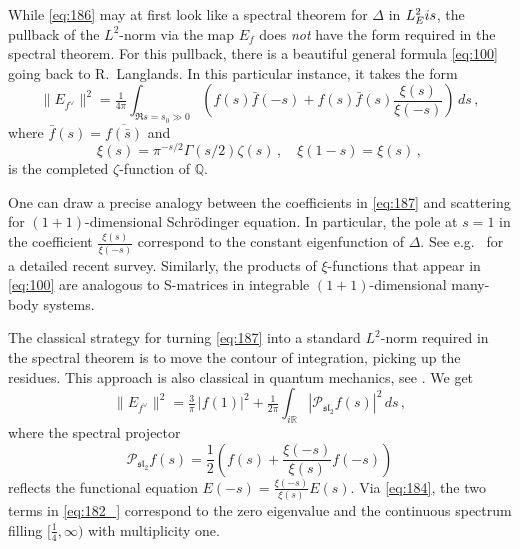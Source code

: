 \documentclass[14pt]{extarticle}
\newcommand{\Q}{\mathbb{Q}}
\newcommand{\R}{\mathbb{R}}
\newcommand{\cP}{\mathscr{P}}
\newcommand{\Eis}{\textup{Eis}}
\theoremstyle{definition}
\begin{document}
While \eqref{eq:186} may at first look like a spectral theorem for
$\Delta$ in $L^2_\Eis$, the pullback of the $L^2$-norm via the map $E_f$
does \emph{not} have the form required in the
spectral theorem. For this pullback, there is a beautiful
general formula \eqref{eq:100} going back to R.~Langlands.
In this particular instance, it 
takes the form  
%
\begin{equation}
\| E_{f^\vee}\|^2 = \tfrac{1}{4\pi} \int_{\Re s = s_0 \gg 0} \left(f(s) \bar f(-s) +
f(s) \bar f(s) \frac{\xi(s)}{\xi(-s)} \right) \, ds \,,  \label{eq:187}
\end{equation}
%
where $\bar f(s) = \overline{f(\bar s)}$ and 
%
\begin{equation}
  \label{eq:188}
  \xi(s) = \pi^{-s/2} \Gamma(s/2) \zeta(s) \,, \quad \xi(1-s) = \xi(s)
  \,,
\end{equation}
%
is the completed $\zeta$-function of $\Q$.



One can draw a precise analogy
between the coefficients in \eqref{eq:187} and scattering for
$(1+1)$-dimensional
Schr\"odinger equation. In particular, the pole at $s=1$ in the
coefficient 
$\frac{\xi(s)}{\xi(-s)}$ correspond to the
constant eigenfunction of $\Delta$. See e.g.\  \cite{Takh} for a detailed
recent survey. Similarly, the products of $\xi$-functions that appear in
\eqref{eq:100} are analogous to S-matrices in integrable
$(1+1)$-dimensional many-body systems. 

The classical strategy for turning \eqref{eq:187} into a standard
$L^2$-norm required in the spectral theorem is to move
the contour of integration, picking up the residues. This
approach is also classical in quantum mechanics, see \cite{Takh}. We get
%
\begin{equation}
  \label{eq:182_}
  \| E_{f^\vee}\|^2 = \tfrac{3}{\pi} \, |f(1)|^2 + \tfrac{1}{2\pi}
  \int_{i\R} 
  |\cP_{\mathfrak{sl}_2} f(s)|^2 \, ds \,, 
\end{equation}
%
where the spectral projector
%
\begin{equation}
  \label{eq:190}
  \cP_{\mathfrak{sl}_2} f(s) = \frac12 \left( f(s) +
    \frac{\xi(-s)}{\xi(s)} f(-s)
    \right)
  \end{equation}
reflects the functional equation $E(-s) =  \frac{\xi(-s)}{\xi(s)}
E(s)$. Via \eqref{eq:184}, the two terms in 
\eqref{eq:182_} correspond to the zero eigenvalue and
the continuous spectrum filling $[\frac14,\infty)$ with
multiplicity one. 
\end{document}
